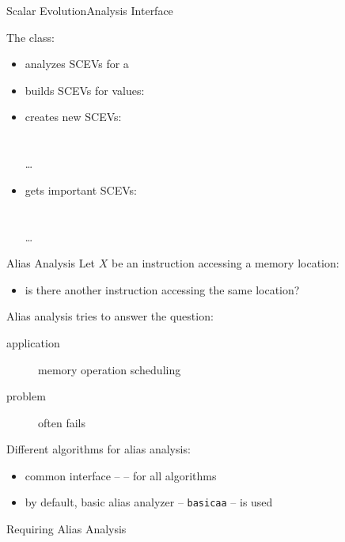 \begin{frame}{Scalar Evolution}{Analysis Interface}

The  class:

\begin{itemize}
\item analyzes SCEVs for a 
\vfill
\item builds SCEVs for values: \\
\vfill
\item creates new SCEVs: \\
 \\
 \\
\ldots
\vfill
\item gets important SCEVs: \\
       \\
       \\
      \ldots
\end{itemize}
\end{frame}


\begin{frame}{Alias Analysis}
Let $X$ be an instruction accessing a memory location:

\begin{itemize}
\item is there another instruction accessing the same location?
\end{itemize}

\vfill
Alias analysis tries to answer the question:

\begin{description}
\item[application] memory operation scheduling
\item[problem] often fails
\end{description}

\vfill
Different algorithms for alias analysis:

\begin{itemize}
\item common interface --  -- for all algorithms
\item by default, basic alias analyzer -- \texttt{basicaa} -- is used
\end{itemize}

\begin{block}{Requiring Alias Analysis}
\centering
{}
\end{block}
\end{frame}

